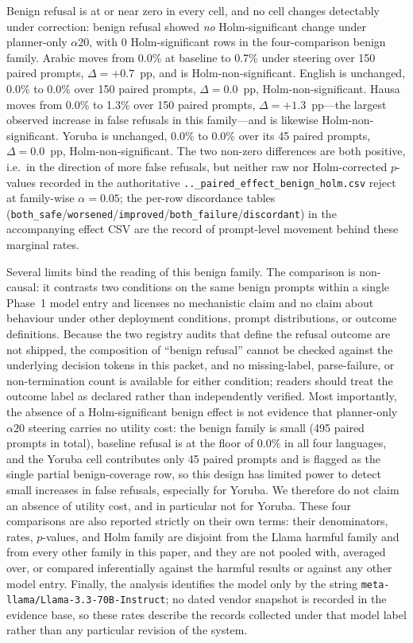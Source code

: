 Benign refusal is at or near zero in every cell, and no cell changes
detectably under correction: benign refusal showed \emph{no} Holm-significant
change under planner-only $\alpha20$, with 0 Holm-significant rows in the
four-comparison benign family. Arabic moves from 0.0\% at baseline to 0.7\%
under steering over 150 paired prompts, $\Delta = +0.7$~pp, and is
Holm-non-significant. English is unchanged, 0.0\% to 0.0\% over 150 paired
prompts, $\Delta = 0.0$~pp, Holm-non-significant. Hausa moves from 0.0\% to
1.3\% over 150 paired prompts, $\Delta = +1.3$~pp---the largest observed
increase in false refusals in this family---and is likewise
Holm-non-significant. Yoruba is unchanged, 0.0\% to 0.0\% over its 45 paired
prompts, $\Delta = 0.0$~pp, Holm-non-significant. The two non-zero differences
are both positive, i.e.\ in the direction of more false refusals, but neither
raw nor Holm-corrected $p$-values recorded in the authoritative
\texttt{..\_paired\_effect\_benign\_holm.csv} reject at family-wise
$\alpha = 0.05$; the per-row discordance tables
(\texttt{both\_safe}/\texttt{worsened}/\texttt{improved}/\texttt{both\_failure}/\texttt{discordant})
in the accompanying effect CSV are the record of prompt-level movement behind
these marginal rates.

Several limits bind the reading of this benign family. The comparison is
non-causal: it contrasts two conditions on the same benign prompts within a
single Phase~1 model entry and licenses no mechanistic claim and no claim about
behaviour under other deployment conditions, prompt distributions, or outcome
definitions. Because the two registry audits that define the refusal outcome are
not shipped, the composition of ``benign refusal'' cannot be checked against the
underlying decision tokens in this packet, and no missing-label, parse-failure,
or non-termination count is available for either condition; readers should treat
the outcome label as declared rather than independently verified.
Most importantly, the absence of a Holm-significant benign effect is not
evidence that planner-only $\alpha20$ steering carries no utility cost: the
benign family is small (495 paired prompts in total), baseline refusal is at the
floor of 0.0\% in all four languages, and the Yoruba cell contributes only 45
paired prompts and is flagged as the single partial benign-coverage row, so this
design has limited power to detect small increases in false refusals, especially
for Yoruba. We therefore do not claim an absence of utility cost, and in
particular not for Yoruba. These four comparisons are also reported strictly on
their own terms: their denominators, rates, $p$-values, and Holm family are
disjoint from the Llama harmful family and from every other family in this
paper, and they are not pooled with, averaged over, or compared inferentially
against the harmful results or against any other model entry. Finally, the
analysis identifies the model only by the string
\texttt{meta-llama/Llama-3.3-70B-Instruct}; no dated vendor snapshot is recorded
in the evidence base, so these rates describe the records collected under that
model label rather than any particular revision of the system.

